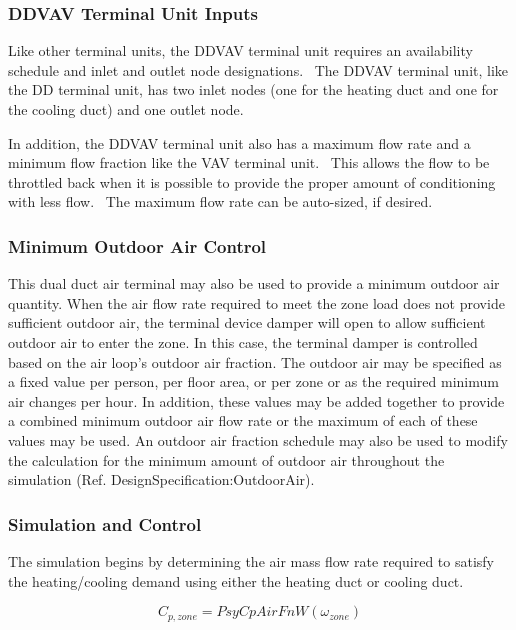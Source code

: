 \subsubsection{DDVAV Terminal Unit Inputs}\label{ddvav-terminal-unit-inputs}

Like other terminal units, the DDVAV terminal unit requires an availability schedule and inlet and outlet node designations.~ The DDVAV terminal unit, like the DD terminal unit, has two inlet nodes (one for the heating duct and one for the cooling duct) and one outlet node.

In addition, the DDVAV terminal unit also has a maximum flow rate and a minimum flow fraction like the VAV terminal unit.~ This allows the flow to be throttled back when it is possible to provide the proper amount of conditioning with less flow.~ The maximum flow rate can be auto-sized, if desired.

\subsubsection{Minimum Outdoor Air Control}\label{minimum-outdoor-air-control-1}

This dual duct air terminal may also be used to provide a minimum outdoor air quantity. When the air flow rate required to meet the zone load does not provide sufficient outdoor air, the terminal device damper will open to allow sufficient outdoor air to enter the zone. In this case, the terminal damper is controlled based on the air loop's outdoor air fraction. The outdoor air may be specified as a fixed value per person, per floor area, or per zone or as the required minimum air changes per hour. In addition, these values may be added together to provide a combined minimum outdoor air flow rate or the maximum of each of these values may be used. An outdoor air fraction schedule may also be used to modify the calculation for the minimum amount of outdoor air throughout the simulation (Ref. DesignSpecification:OutdoorAir).

\subsubsection{Simulation and Control}\label{simulation-and-control-6}

The simulation begins by determining the air mass flow rate required to satisfy the heating/cooling demand using either the heating duct or cooling duct.

\begin{equation}
C_{p,zone} = PsyCpAirFnW\left( {\omega_{zone}} \right)
\end{equation}

